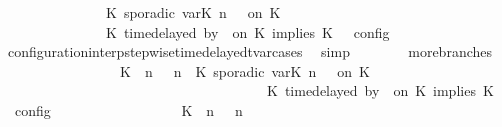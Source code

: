 \begin{isabellebody}
\ \ \ \ \ \ \ \ \ \ \ \ \ \ {\isasymturnstile}\ {\isacharparenleft}K\ sporadic{\isasymsharp}\ {\isasymlparr}{\isasymtau}\isactrlsub v\isactrlsub a\isactrlsub r{\isacharparenleft}K\ n{\isacharparenright}\ {\isasymoplus}\ {\isasymdelta}{\isasymtau}{\isasymrparr}\ on\ K\ {\isacharhash}\ {\isasymPsi}\isanewline
\ \ \ \ \ \ \ \ \ \ \ \ \ \ {\isasymtriangleright}\ {\isacharparenleft}{\isacharparenleft}K\ time{\isacharminus}delayed{\isasymsharp}\ by\ {\isasymdelta}{\isasymtau}\ on\ K\ implies\ K\ {\isacharhash}\ {\isasymPhi}{\isacharparenright}\ {\isasymrbrakk}\isactrlsub c\isactrlsub o\isactrlsub n\isactrlsub f\isactrlsub i\isactrlsub g{\isacartoucheclose}\isanewline
\ \ \ \ \ \ \ \ \isamarkupfalse%
\ configuration{\isacharunderscore}interp{\isacharunderscore}stepwise{\isacharunderscore}timedelayed{\isacharunderscore}tvar{\isacharunderscore}cases\ \isamarkupfalse%
\ simp\isanewline
\ \ \ \ \ \ \isamarkupfalse%
\ more{\isacharunderscore}branches{\isacharcolon}\isanewline
\ \ \ \ \ \ \ \ \ \ \ \ \ \ \ \ {\isacartoucheopen}{\isasymlbrakk}\ {\isacharparenleft}{\isacharparenleft}K\ {\isasymUp}\ n{\isacharparenright}\ {\isacharhash}\ {\isasymGamma}{\isacharparenright}{\isacharcomma}\ n\ {\isasymturnstile}\ {\isacharparenleft}{\isacharparenleft}K\ sporadic{\isasymsharp}\ {\isasymlparr}{\isasymtau}\isactrlsub v\isactrlsub a\isactrlsub r{\isacharparenleft}K\ n{\isacharparenright}\ {\isasymoplus}\ {\isasymdelta}{\isasymtau}{\isasymrparr}\ on\ K\ {\isacharhash}\ {\isasymPsi}{\isacharparenright}\isanewline
\ \ \ \ \ \ \ \ \ \ \ \ \ \ \ \ \ \ \ \ \ \ \ \ \ \ \ \ \ \ \ \ \ \ \ \ \ {\isasymtriangleright}\ {\isacharparenleft}{\isacharparenleft}K\ time{\isacharminus}delayed{\isasymsharp}\ by\ {\isasymdelta}{\isasymtau}\ on\ K\ implies\ K\ {\isacharhash}\ {\isasymPhi}{\isacharparenright}\ {\isasymrbrakk}\isactrlsub c\isactrlsub o\isactrlsub n\isactrlsub f\isactrlsub i\isactrlsub g\isanewline
\ \ \ \ \ \ \ \ \ \ \ \ \ \ \ \ {\isacharequal}\ {\isasymlbrakk}\ {\isacharparenleft}{\isacharparenleft}K\ {\isasymUp}\ n{\isacharparenright}\ {\isacharhash}\ {\isasymGamma}{\isacharparenright}{\isacharcomma}\ n\ {\isasymturnstile}\ {\isasymPsi}\isanewline

\end{isabellebody}
